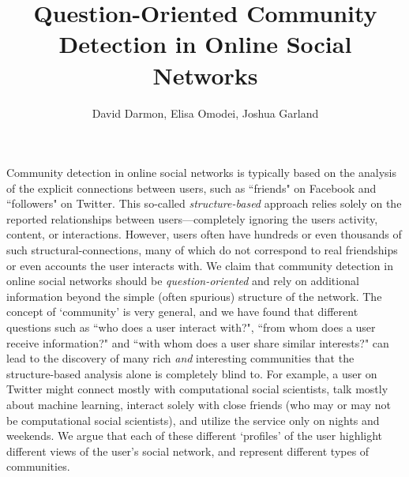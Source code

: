 \documentclass[10pt,a4paper]{article}
\title{Question-Oriented Community Detection in Online Social Networks}
\author{David Darmon, Elisa Omodei, Joshua Garland}
\date{}
\begin{document}
\maketitle




Community detection in online social networks is typically based on the analysis of the explicit connections between users, such as ``friends" on Facebook and ``followers" on Twitter. This so-called \emph{structure-based} approach relies solely on the reported relationships between users---completely ignoring the users activity, content, or interactions. However, users often have hundreds or even thousands of such structural-connections, many of which do not correspond to real friendships or even accounts the user interacts with. We claim that community detection in online social networks should be \emph{question-oriented} and rely on additional information beyond the simple (often spurious) structure of the network. The concept of `community' is very general, and we have found that different questions such as ``who does a user interact with?", ``from whom does a user receive information?" and ``with whom does a user share similar interests?" can lead to the discovery of many rich \emph{and} interesting communities that the structure-based analysis alone is completely blind to. 
For example, a user on Twitter might connect mostly with computational social scientists, talk mostly about machine learning, interact solely with close friends (who may or may not be computational social scientists), and utilize the service only on nights and weekends. We argue that each of these different `profiles' of the user highlight different views of the user's social network, and represent different types of communities. 
\end{document}
